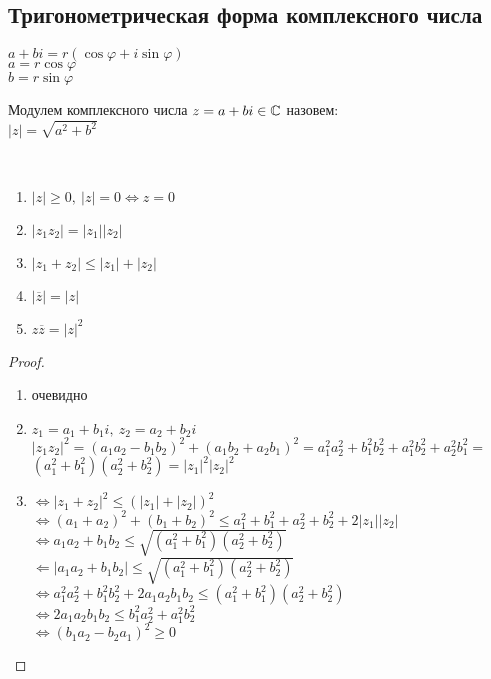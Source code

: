 \begin{normalsize}

\section{Тригонометрическая форма комплексного числа}

\begin{defn}
    $a + bi = r(\cos\varphi + i\sin\varphi)$\\
    $a = r\cos\varphi$\\
    $b = r\sin\varphi$\\
\end{defn}

\begin{defn}
    Модулем комплексного числа $z = a + bi \in \mathbb{C}$ назовем:\\
    $|z| = \sqrt{a^2 + b^2}$\\
\end{defn}

\begin{theorem-non}\ 
    \begin{enumerate}
        \item $|z| \geq 0,~|z| = 0 \iff z = 0$
        \item $|z_1 z_2| = |z_1||z_2|$
        \item $|z_1 + z_2| \leq |z_1| + |z_2|$
        \item $|\overline{z}| = |z|$
        \item $z \overline{z} = |z|^2$
    \end{enumerate}
\end{theorem-non}

\begin{proof}
    \begin{enumerate}
        \item очевидно
        
        \item $z_1 = a_1 + b_1i,~z_2 = a_2 + b_2i$\\
        $|z_1 z_2|^2 = (a_1 a_2 - b_1 b_2)^2 + (a_1 b_2 + a_2 b_1)^2 = a_1^2 a_2^2 + b_1^2 b_2^2 + a_1^2 b_2^2 + a_2^2 b_1^2 = $\\
        $(a_1^2 + b_1^2)(a_2^2 + b_2^2) = |z_1|^2|z_2|^2$
        
        \item $\iff |z_1 + z_2|^2 \leq (|z_1| + |z_2|)^2$\\
        $\iff (a_1 + a_2)^2 + (b_1 + b_2)^2 \leq a_1^2 + b_1^2 + a_2^2 + b_2^2 + 2|z_1||z_2|$\\
        $\iff a_1a_2 + b_1b_2 \leq \sqrt{(a_1^2 + b_1^2)(a_2^2 + b_2^2)}$\\
        $\Leftarrow |a_1 a_2 + b_1 b_2| \leq \sqrt{(a_1^2 + b_1^2)(a_2^2 + b_2^2)}$\\
        $\iff a_1^2 a_2^2 + b_1^2 b_2^2 + 2a_1a_2b_1b_2 \leq (a_1^2 + b_1^2)(a_2^2 + b_2^2)$\\
        $\iff 2a_1a_2b_1b_2 \leq b_1^2 a_2^2 + a_1^2 b_2^2$\\
        $\iff (b_1 a_2 - b_2 a_1)^2 \geq 0$


\end{enumerate}
\end{proof}
\end{normalsize}
